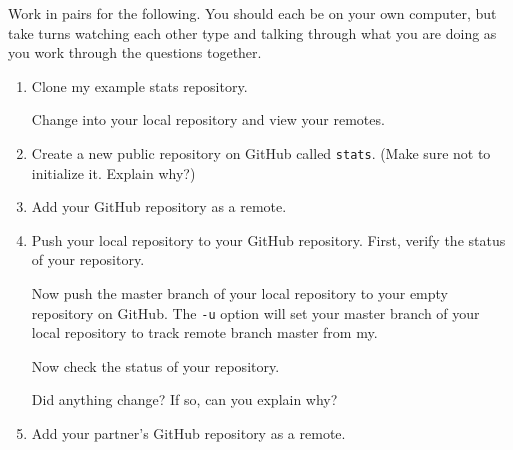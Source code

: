 \documentclass{article}
\begin{document}
\begin{enumerate}
Work in pairs for the following.  You should each be on your own computer, but
take turns watching each other type and talking through what you are doing as
you work through the questions together.

\begin{enumerate}
\item Clone my example stats repository.

Change into your local repository and view your remotes.

\item Create a new public repository on GitHub called \texttt{stats}.  (Make
  sure not to initialize it.  Explain why?)

\item Add your GitHub repository as a remote.

\item Push your local repository to your GitHub repository.
First, verify the status of your repository.
%

Now push the master branch of your local repository to your
empty repository on GitHub.
The \texttt{-u} option will set your master branch of your local
repository to track remote branch master from my.

Now check the status of your repository.

Did anything change?  If so, can you explain why?  

\item Add your partner's GitHub repository as a remote.


\end{enumerate}
\end{enumerate}
\end{document}
